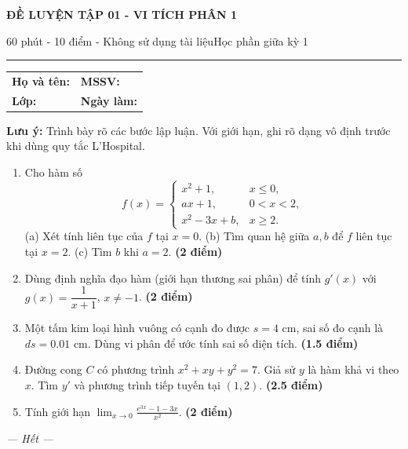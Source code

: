 \documentclass[11pt,a4paper]{article}
\newcommand{\examtitle}[4]{\begin{center}{\Large\bfseries\color{hcmusblue}#1}\par\vspace{3pt}{\large\bfseries #2}\par\vspace{3pt}\small #3\quad\textbullet\quad #4\end{center}\vspace{5pt}\hrule\vspace{8pt}}
\newcommand{\studentline}{\begin{tabularx}{\textwidth}{X X}\textbf{Họ và tên:} \hrulefill & \textbf{MSSV:} \hrulefill\\[7pt]\textbf{Lớp:} \hrulefill & \textbf{Ngày làm:} \hrulefill\end{tabularx}\vspace{8pt}}
\newcommand{\points}[1]{\hfill\textbf{(#1 điểm)}}
\begin{document}
\examtitle{ĐỀ LUYỆN TẬP 01 - VI TÍCH PHÂN 1}{VI TÍCH PHÂN 1 - HCMUS (bộ luyện tập)}{60 phút - 10 điểm - Không sử dụng tài liệu}{Học phần giữa kỳ 1}

\studentline
\begin{notebox}\textbf{Lưu ý:} Trình bày rõ các bước lập luận. Với giới hạn, ghi rõ dạng vô định trước khi dùng quy tắc L'Hospital.\end{notebox}
\begin{enumerate}
\item Cho hàm số
\[
f(x)=\begin{cases}x^2+1,&x\le 0,\\ ax+1,&0<x<2,\\ x^2-3x+b,&x\ge 2.\end{cases}
\]
(a) Xét tính liên tục của $f$ tại $x=0$. (b) Tìm quan hệ giữa $a,b$ để $f$ liên tục tại $x=2$. (c) Tìm $b$ khi $a=2$. \points{2}
\item Dùng định nghĩa đạo hàm (giới hạn thương sai phân) để tính $g'(x)$ với $g(x)=\dfrac{1}{x+1}$, $x\ne -1$. \points{2}
\item Một tấm kim loại hình vuông có cạnh đo được $s=4$ cm, sai số đo cạnh là $ds=0.01$ cm. Dùng vi phân để ước tính sai số diện tích. \points{1.5}
\item Đường cong $C$ có phương trình $x^2+xy+y^2=7$. Giả sử $y$ là hàm khả vi theo $x$. Tìm $y'$ và phương trình tiếp tuyến tại $(1,2)$. \points{2.5}
\item Tính giới hạn $\displaystyle\lim_{x\to0}\frac{e^{3x}-1-3x}{x^2}$. \points{2}
\end{enumerate}
\vfill
\begin{center}\textit{--- Hết ---}\end{center}
\end{document}

